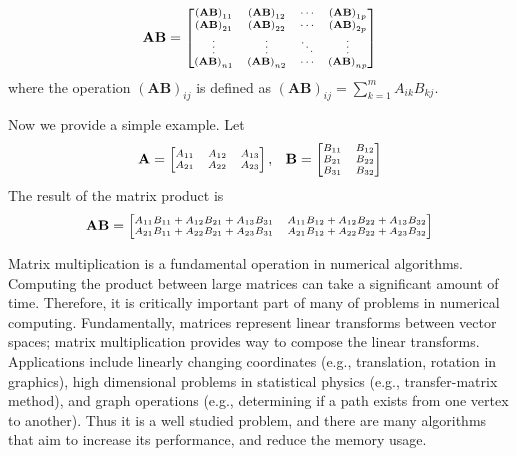 \begin{equation}
\scriptsize
\mathbf{AB} = \begin{bmatrix}
 \left(\mathbf{AB}\right)_{11} & \left(\mathbf{AB}\right)_{12} & \cdots & \left(\mathbf{AB}\right)_{1p} \\
 \left(\mathbf{AB}\right)_{21} & \left(\mathbf{AB}\right)_{22} & \cdots & \left(\mathbf{AB}\right)_{2p} \\
\vdots & \vdots & \ddots & \vdots \\
 \left(\mathbf{AB}\right)_{n1} & \left(\mathbf{AB}\right)_{n2} & \cdots & \left(\mathbf{AB}\right)_{np} \\
\end{bmatrix}
\end{equation} where the operation $\left(\mathbf{AB}\right)_{ij}$ is defined as $\left(\mathbf{A}\mathbf{B}\right)_{ij} = \sum_{k=1}^m A_{ik}B_{kj}$.

Now we provide a simple example. Let
\begin{equation}
\scriptsize
\mathbf{A} =
 \begin{bmatrix}
 \label{eq:ABmatrix}
  A_{11} & A_{12}  &  A_{13} \\
  A_{21} & A_{22} & A_{23} \\
 \end{bmatrix},  \quad
\mathbf{B} =
 \begin{bmatrix}
  B_{11} & B_{12}  \\
  B_{21} & B_{22}   \\
   B_{31} & B_{32}  \\
 \end{bmatrix}
\end{equation}
The result of the matrix product is
\begin{equation}
\scriptsize
\label{eq:ABmatrix_product}\mathbf{AB} = \begin{bmatrix}
 A_{11}B_{11} + A_{12}B_{21} + A_{13}B_{31} & A_{11}B_{12} + A_{12}B_{22} + A_{13}B_{32} \\
 A_{21}B_{11} + A_{22}B_{21} + A_{23}B_{31} & A_{21}B_{12} + A_{22}B_{22} + A_{23}B_{32}\\
\end{bmatrix}
\end{equation}

Matrix multiplication is a fundamental operation in numerical algorithms. Computing the product between large matrices can take a significant amount of time. Therefore, it is critically important part of many of problems in numerical computing. Fundamentally, matrices represent linear transforms between vector spaces; matrix multiplication provides way to compose the linear transforms.  Applications include linearly changing coordinates (e.g., translation, rotation in graphics), high dimensional problems in statistical physics (e.g., transfer-matrix method), and graph operations (e.g., determining if a path exists from one vertex to another). Thus it is a well studied problem, and there are many algorithms that aim to increase its performance, and reduce the memory usage.

